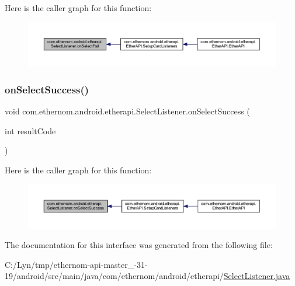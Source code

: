Here is the caller graph for this function\+:\nopagebreak
\begin{figure}[H]
\begin{center}
\leavevmode
\includegraphics[width=350pt]{interfacecom_1_1ethernom_1_1android_1_1etherapi_1_1_select_listener_a7ecaa3bf4d2d13db58fe1a027e2340e6_icgraph}
\end{center}
\end{figure}
\mbox{\label{interfacecom_1_1ethernom_1_1android_1_1etherapi_1_1_select_listener_a890afbd52a51aeb70f6859d8ed26a325}} 
\subsubsection{\texorpdfstring{on\+Select\+Success()}{onSelectSuccess()}}
{\footnotesize\ttfamily void com.\+ethernom.\+android.\+etherapi.\+Select\+Listener.\+on\+Select\+Success (\begin{DoxyParamCaption}\item[{int}]{result\+Code }\end{DoxyParamCaption})}

Here is the caller graph for this function\+:\nopagebreak
\begin{figure}[H]
\begin{center}
\leavevmode
\includegraphics[width=350pt]{interfacecom_1_1ethernom_1_1android_1_1etherapi_1_1_select_listener_a890afbd52a51aeb70f6859d8ed26a325_icgraph}
\end{center}
\end{figure}


The documentation for this interface was generated from the following file\+:\begin{DoxyCompactItemize}
\item 
C\+:/\+Lyn/tmp/ethernom-\/api-\/master\+\_-\/31-\/19/android/src/main/java/com/ethernom/android/etherapi/\mbox{\hyperlink{_select_listener_8java}{Select\+Listener.\+java}}\end{DoxyCompactItemize}
